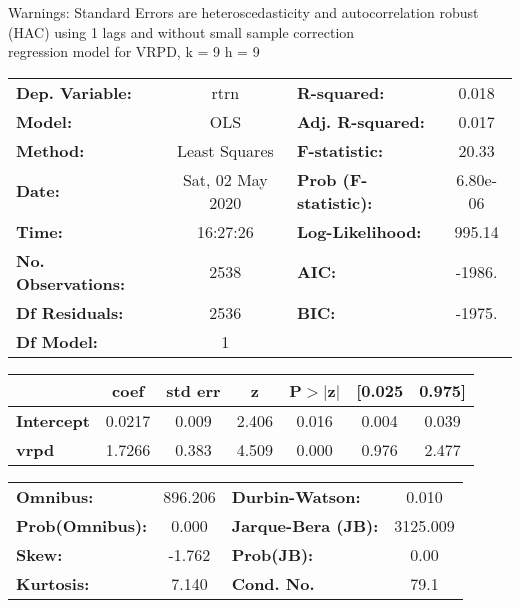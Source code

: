 Warnings: \newline
 [1] Standard Errors are heteroscedasticity and autocorrelation robust (HAC) using 1 lags and without small sample correction\\ 

regression model for VRPD, k = 9 h = 9\begin{center}
\begin{tabular}{lclc}
\toprule
\textbf{Dep. Variable:}    &       rtrn       & \textbf{  R-squared:         } &     0.018   \\
\textbf{Model:}            &       OLS        & \textbf{  Adj. R-squared:    } &     0.017   \\
\textbf{Method:}           &  Least Squares   & \textbf{  F-statistic:       } &     20.33   \\
\textbf{Date:}             & Sat, 02 May 2020 & \textbf{  Prob (F-statistic):} &  6.80e-06   \\
\textbf{Time:}             &     16:27:26     & \textbf{  Log-Likelihood:    } &    995.14   \\
\textbf{No. Observations:} &        2538      & \textbf{  AIC:               } &    -1986.   \\
\textbf{Df Residuals:}     &        2536      & \textbf{  BIC:               } &    -1975.   \\
\textbf{Df Model:}         &           1      & \textbf{                     } &             \\
\bottomrule
\end{tabular}
\begin{tabular}{lcccccc}
                   & \textbf{coef} & \textbf{std err} & \textbf{z} & \textbf{P$> |$z$|$} & \textbf{[0.025} & \textbf{0.975]}  \\
\midrule
\textbf{Intercept} &       0.0217  &        0.009     &     2.406  &         0.016        &        0.004    &        0.039     \\
\textbf{vrpd}      &       1.7266  &        0.383     &     4.509  &         0.000        &        0.976    &        2.477     \\
\bottomrule
\end{tabular}
\begin{tabular}{lclc}
\textbf{Omnibus:}       & 896.206 & \textbf{  Durbin-Watson:     } &    0.010  \\
\textbf{Prob(Omnibus):} &   0.000 & \textbf{  Jarque-Bera (JB):  } & 3125.009  \\
\textbf{Skew:}          &  -1.762 & \textbf{  Prob(JB):          } &     0.00  \\
\textbf{Kurtosis:}      &   7.140 & \textbf{  Cond. No.          } &     79.1  \\
\bottomrule
\end{tabular}
\end{center}

